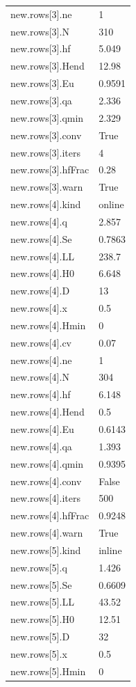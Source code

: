 {\begin{longtable}{p{}p{}}
{}new.rows[3].ne & 1\\
{}new.rows[3].N & 310\\
{}new.rows[3].hf & 5.049\\
{}new.rows[3].Hend & 12.98\\
{}new.rows[3].Eu & 0.9591\\
{}new.rows[3].qa & 2.336\\
{}new.rows[3].qmin & 2.329\\
{}new.rows[3].conv & True\\
{}new.rows[3].iters & 4\\
{}new.rows[3].hfFrac & 0.28\\
{}new.rows[3].warn & True\\
{}new.rows[4].kind & online\\
{}new.rows[4].q & 2.857\\
{}new.rows[4].Se & 0.7863\\
{}new.rows[4].LL & 238.7\\
{}new.rows[4].H0 & 6.648\\
{}new.rows[4].D & 13\\
{}new.rows[4].x & 0.5\\
{}new.rows[4].Hmin & 0\\
{}new.rows[4].cv & 0.07\\
{}new.rows[4].ne & 1\\
{}new.rows[4].N & 304\\
{}new.rows[4].hf & 6.148\\
{}new.rows[4].Hend & 0.5\\
{}new.rows[4].Eu & 0.6143\\
{}new.rows[4].qa & 1.393\\
{}new.rows[4].qmin & 0.9395\\
{}new.rows[4].conv & False\\
{}new.rows[4].iters & 500\\
{}new.rows[4].hfFrac & 0.9248\\
{}new.rows[4].warn & True\\
{}new.rows[5].kind & inline\\
{}new.rows[5].q & 1.426\\
{}new.rows[5].Se & 0.6609\\
{}new.rows[5].LL & 43.52\\
{}new.rows[5].H0 & 12.51\\
{}new.rows[5].D & 32\\
{}new.rows[5].x & 0.5\\
{}new.rows[5].Hmin & 0\\

\end{longtable}}
